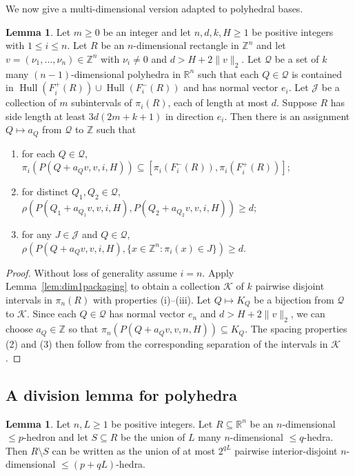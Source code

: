 \documentclass{amsart}
\theoremstyle{definition}
\newtheorem{lemma}[theorem]{Lemma}
\DeclareMathOperator{\Hull}{Hull}
\begin{document}
We now give a multi-dimensional version adapted to polyhedral bases.

\begin{lemma}\label{lem:1directionmultiple}
Let $m\geq 0$ be an integer and let $n, d, k, H\geq 1$ be positive integers
with $1\leq i\leq n$. Let $R$ be an $n$-dimensional rectangle in
$\mathbb{Z}^n$ and let $v=(\nu_1,\dots,\nu_n)\in\mathbb{Z}^n$ with
$\nu_i\neq 0$ and $d>H+2\|v\|_2$. Let $\mathcal{Q}$ be a set of $k$ many
$(n-1)$-dimensional polyhedra in $\mathbb{R}^n$ such that each
$Q\in\mathcal{Q}$ is contained in
$\Hull(F_i^+(R))\cup\Hull(F_i^-(R))$ and has normal vector $e_i$.
Let $\mathcal{J}$ be a collection of $m$ subintervals of $\pi_i(R)$,
each of length at most $d$. Suppose $R$ has side length at least
$3d(2m+k+1)$ in direction $e_i$. Then there is an assignment
$Q\mapsto a_Q$ from $\mathcal{Q}$ to $\mathbb{Z}$ such that
\begin{enumerate}
\item[(1)] for each $Q\in\mathcal{Q}$,
$\pi_i(P(Q+a_Q v, v, i, H))\subseteq
[\pi_i(F_i^-(R)), \pi_i(F_i^+(R))]$;
\item[(2)] for distinct $Q_1, Q_2\in\mathcal{Q}$,
$\rho(P(Q_1+a_{Q_1} v, v, i, H), P(Q_2+a_{Q_2} v, v, i, H))\geq d$;
\item[(3)] for any $J\in\mathcal{J}$ and $Q\in\mathcal{Q}$,
$\rho(P(Q+a_Q v, v, i, H),
\{x\in\mathbb{Z}^n\colon \pi_i(x)\in J\})\geq d$.
\end{enumerate}
\end{lemma}

\begin{proof}
Without loss of generality assume $i=n$. Apply
Lemma~\ref{lem:dim1packaging} to obtain a collection $\mathcal{K}$ of $k$
pairwise disjoint intervals in $\pi_n(R)$ with properties (i)--(iii).
Let $Q\mapsto K_Q$ be a bijection from $\mathcal{Q}$ to $\mathcal{K}$.
Since each $Q\in\mathcal{Q}$ has normal vector $e_n$ and
$d>H+2\|v\|_2$, we can choose $a_Q\in\mathbb{Z}$ so that
$\pi_n(P(Q+a_Q v, v, n, H))\subseteq K_Q$. The spacing properties (2) and (3) then follow from the corresponding
separation of the intervals in $\mathcal{K}$.
\end{proof}

\subsection{A division lemma for polyhedra}

\begin{lemma}\label{lem:division}
Let $n, L\geq 1$ be positive integers. Let $R\subseteq\mathbb{R}^n$ be an
$n$-dimensional $\leq\!\! p$-hedron and let $S\subseteq R$ be the union of $L$
many $n$-dimensional $\leq\!\! q$-hedra. Then $R\setminus \!S$ can be written as
the union of at most $2^{qL}$ pairwise interior-disjoint $n$-dimensional
$\leq\!\! (p+qL)$-hedra.
\end{lemma}
\end{document}
